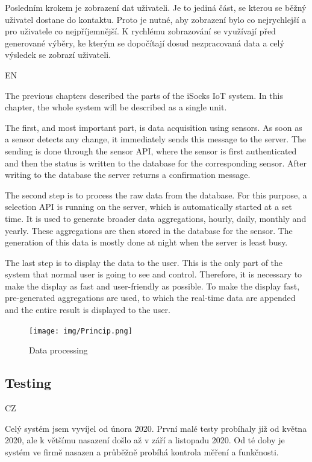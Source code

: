 \documentclass[12pt, a4paper]{article}
\begin{document}
Posledním krokem je zobrazení dat uživateli.
Je to jediná část, se kterou se běžný uživatel dostane do kontaktu.
Proto je nutné, aby zobrazení bylo co nejrychlejší a pro uživatele co nejpříjemnější.
K rychlému zobrazování se využívají před generované výběry, ke kterým se dopočítají dosud nezpracovaná data a celý výsledek se zobrazí uživateli.

EN

The previous chapters described the parts of the iSocks IoT system.
In this chapter, the whole system will be described as a single unit.

The first, and most important part, is data acquisition using sensors.
As soon as a sensor detects any change, it immediately sends this message to the server.
The sending is done through the sensor API, where the sensor is first authenticated and then the status is written to the database for the corresponding sensor.
After writing to the database the server returns a confirmation message.

The second step is to process the raw data from the database.
For this purpose, a selection API is running on the server, which is automatically started at a set time.
It is used to generate broader data aggregations, hourly, daily, monthly and yearly.
These aggregations are then stored in the database for the sensor.
The generation of this data is mostly done at night when the server is least busy.

The last step is to display the data to the user.
This is the only part of the system that normal user is going to see and control.
Therefore, it is necessary to make the display as fast and user-friendly as possible.
To make the display fast, pre-generated aggregations are used, to which the real-time data are appended and the entire result is displayed to the user.

\begin{figure}[t]
    \centering
    \texttt{[image: img/Princip.png]}
    \caption{Data processing}
    \label{fig:princip}
\end{figure}


\subsection*{Testing}

CZ

Celý systém jsem vyvíjel od února 2020.
První malé testy probíhaly již od května 2020, ale k většímu nasazení došlo až v září a listopadu 2020.
Od té doby je systém ve firmě nasazen a průběžně probíhá kontrola měření a funkčnosti.
\end{document}
